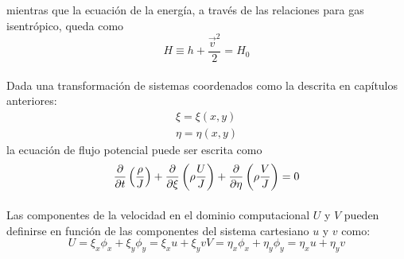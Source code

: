 \documentclass[letterpaper, openright, 12pt]{book}
\begin{document}
        mientras que la ecuación de la energía, a través de las relaciones
        para gas isentrópico, queda como
        \begin{equation}
            H \equiv h + \frac{\vec{v}^2}{2} = H_0
        \end{equation}

    \paragraph*{}
        Dada una transformación de sistemas coordenados como la descrita en
        capítulos anteriores:
        \begin{align*}
            \xi = \xi(x, y)
            \\
            \eta = \eta(x, y)
        \end{align*}
        la ecuación de flujo potencial puede ser escrita como
        \begin{equation}
            \pdv{t} \left( \frac{\rho}{J} \right) + \pdv{\xi} \left( \rho
                    \frac{U}{J} \right) + \pdv{\eta} \left( \rho \frac{V}{J}
                        \right) = 0
            \label{eq_potencial_0}
        \end{equation}

    \paragraph*{}
        Las componentes de la velocidad en el dominio computacional $U$ y $V$
        pueden definirse en función de las componentes del sistema cartesiano
        $u$ y $v$ como:
        \begin{subequations}
            \begin{equation}
                U = \xi_{x} \phi_{x} + \xi_{y} \phi_{y}
                        = \xi_{x} u + \xi_{y} v
            \end{equation}
            \begin{equation}
                V = \eta_{x} \phi_{x} + \eta_{y} \phi_{y}
                        = \eta_{x} u + \eta_{y} v
            \end{equation}
        \end{subequations}
\end{document}
